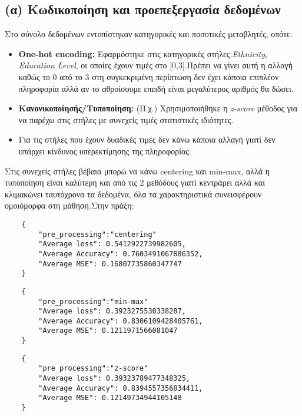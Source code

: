 \documentclass[a4paper,11pt]{article}
\begin{document}
\subsection{(α) Κωδικοποίηση και προεπεξεργασία δεδομένων}
Στο σύνολο δεδομένων εντοπίστηκαν κατηγορικές και ποσοτικές μεταβλητές, οπότε:
\begin{itemize}
    \item \textbf{One-hot encoding:} Εφαρμόστηκε στις κατηγορικές στήλες:\emph{Εthnicity}, \emph{Education Level}, οι οποίες έχουν τιμές στο [0,3].Πρέπει να γίνει αυτή η αλλαγή καθώς το 0 από το 3 στη
    συγκεκριμένη περίπτωση δεν έχει κάποια επιπλέον πληροφορία αλλά αν το αθροίσουμε επειδή είναι μεγαλύτερος αριθμός θα δώσει.
    \item \textbf{Κανονικοποίησής/Τυποποίηση:} (Π.χ.) Χρησιμοποιήθηκε η \emph{z-score} μέθοδος για να παρέχω στις στήλες με συνεχείς τιμές στατιστικές ιδιότητες.
    \item Για τις στήλες που έχουν δυαδικές τιμές δεν κάνω κάποια αλλαγή γιατί δεν υπάρχει κίνδυνος υπερεκτίμησης της πληροφορίας.
\end{itemize}

Στις συνεχείς στήλες βέβαια μπορώ να κάνω  centering και min-max, αλλά η τυποποίηση είναι καλύτερη και από τις 2 μεθόδους γιατί κεντράρει αλλά και κλιμακώνει ταυτόχρονα 
τα δεδομένα, όλα τα χαρακτηριστικά συνεισφέρουν ομοιόμορφα στη μάθηση.Στην πράξη:

\begin{verbatim}
    {
        "pre_processing":"centering"
        "Average loss": 0.5412922739982605,
        "Average Accuracy": 0.7603491067886352,
        "Average MSE": 0.16807735860347747
    }
    \end{verbatim}

\begin{verbatim}
    {
        "pre_processing":"min-max"
        "Average loss": 0.3923275530338287,
        "Average Accuracy": 0.8306109428405761,
        "Average MSE": 0.1211971566081047
    }
    \end{verbatim}

\begin{verbatim}
    {
        "pre_processing":"z-score"    
        "Average loss": 0.39323789477348325,
        "Average Accuracy": 0.8394557356834411,
        "Average MSE": 0.12149734944105148
    }
    \end{verbatim}
\end{document}
